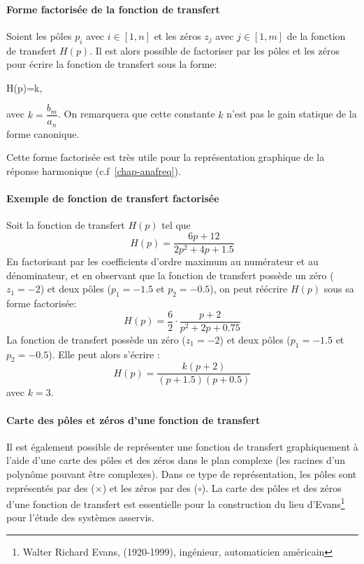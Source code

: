 \paragraph{Forme factorisée de la fonction de transfert}
Soient les pôles $p_i$ avec $i\in[1,n]$ et les zéros $z_j$ 
avec $j\in[1,m]$ de la fonction de transfert $H(p)$. 
Il est alors possible de factoriser par les pôles et les zéros pour 
écrire la fonction de transfert sous la forme:
\begin{bequation}
H(p)=k\cdot{},
\end{bequation}
avec $k=\dfrac{b_m}{a_n}$. On remarquera que cette constante $k$ 
n'est pas le gain statique de la forme canonique.

Cette forme factorisée est très utile pour la représentation graphique
de la réponse harmonique (c.f~\cref{chap-anafreq}).

\paragraph{Exemple de fonction de transfert factorisée}

Soit la fonction de transfert $H(p)$ tel que
$$
H(p)=\dfrac{6p+12}{2p^2+4p+1.5}	
$$
En factorisant par les coefficients d'ordre maximum au numérateur et 
au dénominateur, et en observant que la fonction de transfert possède un 
zéro ($z_1=-2$) et deux pôles ($p_1=-1.5$ et $p_2=-0.5$), 
on peut réécrire $H(p)$ sous sa forme factorisée:
$$
H(p)=\dfrac{6}{2}\cdot\dfrac{p+2}{p^2+2p+0.75}
$$
La fonction de transfert possède un zéro ($z_1=-2$) et deux pôles 
($p_1=-1.5$ et $p_2=-0.5$). Elle peut alors s'écrire :
$$
H(p)=\dfrac{k(p+2)}{(p+1.5)(p+0.5)}
$$
avec $k=3$.
	
\paragraph{Carte des pôles et zéros d'une fonction de transfert}

Il est également possible de représenter une fonction de transfert 
graphiquement à l'aide d'une carte des pôles et des zéros dans le plan complexe 
(les racines d'un polynôme pouvant être complexes). Dans ce type 
de représentation, les pôles sont représentés par des ($\times$) 
et les zéros par des ($\circ$). La carte des pôles et des zéros 
d'une fonction de transfert est essentielle pour la construction du 
lieu d'Evans\footnote{Walter Richard Evans, (1920-1999), 
ingénieur, automaticien américain} pour l'étude des systèmes asservis.

